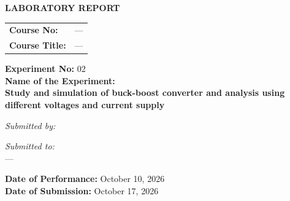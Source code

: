 \documentclass[12pt,a4paper]{article}
\begin{document}
\begin{titlepage}
    \sffamily
    \centering
    \vspace*{1cm}
    
    
    
    
    \Large \textbf{LABORATORY REPORT} \\
    \vspace{1cm}
    
    \begin{tabular}{ll}
        \textbf{Course No:} & — \\
        \textbf{Course Title:} & — \\
    \end{tabular}
    
    \vspace{2cm}
    
    \textbf{Experiment No:} 02 \\
    \vspace{0.5cm}
    \textbf{Name of the Experiment:} \\
    \Large \textbf{ Study and simulation of buck-boost converter and analysis using different voltages and current supply } \\
    
    \vspace{2.5cm}
    
    \begin{minipage}[t]{0.4\textwidth}
        \begin{flushleft} \large
            \emph{Submitted by:}\\
            
            
            
        \end{flushleft}
    \end{minipage}
    \hfill
    \begin{minipage}[t]{0.5\textwidth}
        \begin{flushright} \large
            \emph{Submitted to:} \\
            
            — \\
            
        \end{flushright}
    \end{minipage}

    \vfill
    \textbf{Date of Performance:} October 10, 2026 \\
    \textbf{Date of Submission:} October 17, 2026
    
\end{titlepage}
\end{document}
